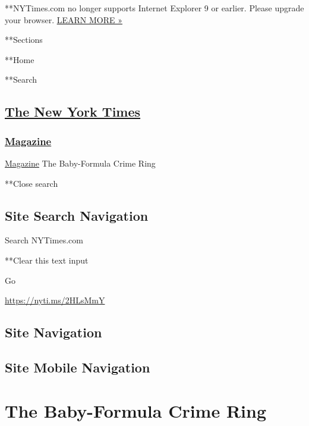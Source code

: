  **NYTimes.com no longer supports Internet Explorer 9 or earlier. Please
upgrade your browser.
\href{http://www.nytimes3xbfgragh.onion/content/help/site/ie9-support.html}{LEARN
MORE »}

**Sections

**Home

**Search

\hypertarget{the-new-york-times}{%
\subsection{\texorpdfstring{\href{http://www.nytimes3xbfgragh.onion/}{The
New York Times}}{The New York Times}}\label{the-new-york-times}}

\hypertarget{-magazine-}{%
\subsubsection{\texorpdfstring{
\href{https://www.nytimes3xbfgragh.onion/section/magazine}{Magazine}
}{ Magazine }}\label{-magazine-}}

 \href{https://www.nytimes3xbfgragh.onion/section/magazine}{Magazine}
\textbar{}The Baby-Formula Crime Ring

**Close search

\hypertarget{site-search-navigation}{%
\subsection{Site Search Navigation}\label{site-search-navigation}}

Search NYTimes.com

**Clear this text input

Go

\url{https://nyti.ms/2HLsMmY}

\hypertarget{site-navigation}{%
\subsection{Site Navigation}\label{site-navigation}}

\hypertarget{site-mobile-navigation}{%
\subsection{Site Mobile Navigation}\label{site-mobile-navigation}}

\hypertarget{the-baby-formula-crime-ring}{%
\section{The Baby-Formula Crime
Ring}\label{the-baby-formula-crime-ring}}

